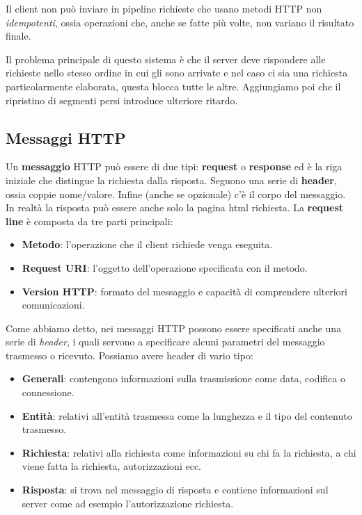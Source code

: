 Il client non può inviare in pipeline richieste che usano metodi HTTP 
non \emph{idempotenti}, ossia operazioni che, anche se fatte più volte,
non variano il risultato finale.

Il problema principale di questo sistema è che il server deve 
rispondere alle richieste nello stesso ordine in cui gli sono arrivate 
e nel caso ci sia una richiesta particolarmente elaborata, questa 
blocca tutte le altre. Aggiungiamo poi che il ripristino di segmenti 
persi introduce ulteriore ritardo.

\subsection{Messaggi HTTP}
Un \textbf{messaggio} HTTP può essere di due tipi: \textbf{request} o 
\textbf{response} ed è la riga iniziale che distingue la richiesta 
dalla risposta. Seguono una serie di \textbf{header}, ossia coppie 
nome/valore. Infine (anche se opzionale) c'è il corpo del messaggio. In
realtà la risposta può essere anche solo la pagina html richiesta. La 
\textbf{request line} è composta da tre parti principali:
\begin{itemize}
	\item \textbf{Metodo}: l'operazione che il client richiede venga 
		eseguita.
	\item \textbf{Request URI}: l'oggetto dell'operazione specificata 
		con il metodo.
	\item \textbf{Version HTTP}: formato del messaggio e capacità di 
		comprendere ulteriori comunicazioni.
\end{itemize}
Come abbiamo detto, nei messaggi HTTP possono essere specificati anche 
una serie di \emph{header}, i quali servono a specificare alcuni 
parametri del messaggio trasmesso o ricevuto. Possiamo avere header di 
vario tipo:
\begin{itemize}
	\item \textbf{Generali}: contengono informazioni sulla trasmissione
		come data, codifica o connessione.
	\item \textbf{Entità}: relativi all'entità trasmessa come la 
		lunghezza e il tipo del contenuto trasmesso.
	\item \textbf{Richiesta}: relativi alla richiesta come informazioni
		su chi fa la richiesta, a chi viene fatta la richiesta,
		autorizzazioni ecc.
	\item \textbf{Risposta}: si trova nel messaggio di risposta e 
		contiene informazioni sul server come ad esempio 
		l'autorizzazione richiesta.
\end{itemize}
